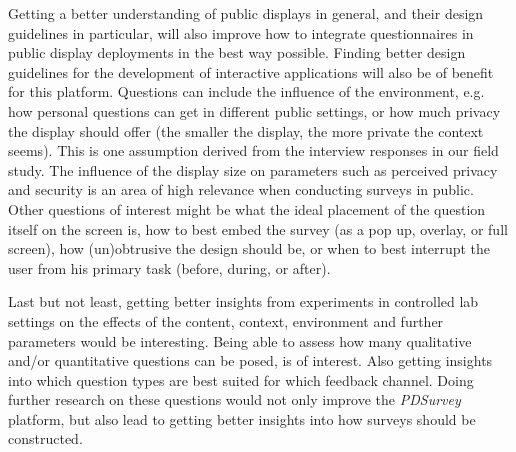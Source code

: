 Getting a better understanding of public displays in general, and their design guidelines in particular, will also improve how to integrate questionnaires in public display deployments in the best way possible. Finding better design guidelines for the development of interactive applications will also be of benefit for this platform. Questions can include the influence of the environment, e.g. how personal questions can get in different public settings, or how much privacy the display should offer (the smaller the display, the more private the context seems). This is one assumption derived from the interview responses in our field study. The influence of the display size on parameters such as perceived privacy and security is an area of high relevance when conducting surveys in public.
Other questions of interest might be what the ideal placement of the question itself on the screen is, how to best embed the survey (as a pop up, overlay, or full screen), how (un)obtrusive the design should be, or when to best interrupt the user from his primary task (before, during, or after).


Last but not least, getting better insights from experiments in controlled lab settings on the effects of the content, context, environment and further parameters would be interesting. Being able to assess how many qualitative and/or quantitative questions can be posed, is of interest. Also getting insights into which question types are best suited for which feedback channel.
Doing further research on these questions would not only improve the \textit{PDSurvey} platform, but also lead to getting better insights into how surveys should be constructed.




